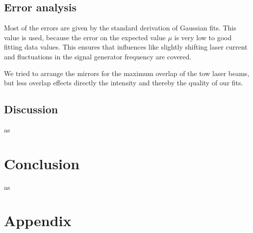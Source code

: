 \documentclass[]{article}
\begin{document}
\subsection{Error analysis}
Most of the errors are given by the standard derivation of Gaussian fits. This value is used, because the error on the expected value $\mu$ is very low to good fitting data values. This ensures that influences like slightly shifting laser current and fluctuations in the signal generator frequency are covered.

We tried to arrange the mirrors for the maximum overlap of the tow laser beams, but less overlap effects directly the intensity and thereby the quality of our fits. 


\subsection{Discussion}
as

\newpage
\section{Conclusion}
as


\section{Appendix}
\end{document}
